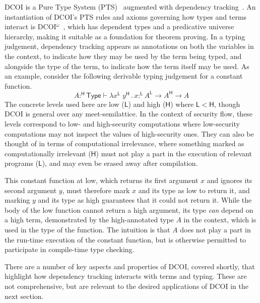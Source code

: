\documentclass{article}
\newcommand{\kw}[1]{\mathsf{#1}}
\newcommand{\HH}{\mathsf{H}}
\newcommand{\LL}{\mathsf{L}}
\begin{document}
DCOI is a Pure Type System (PTS)~\citep{pts} augmented with dependency tracking~\cite{dcc}.
An instantiation of DCOI's PTS rules and axioms governing how types and terms interact
is DCOI$^\omega$~\citep{dcoi-omega},
which has dependent types and a predicative universe hierarchy,
making it suitable as a foundation for theorem proving.
In a typing judgement, dependency tracking appears as annotations
on both the variables in the context,
to indicate how they may be used by the term being typed,
and alongside the type of the term,
to indicate how the term itself may be used.
As an example, consider the following derivable typing judgement for a constant function.
$$A :^\HH \kw{Type} \vdash \lambda x^\LL \; y^\HH \mathpunct{.} x :^\LL
  A^\LL \to A^\HH \to A$$
The concrete levels used here are low ($\LL$) and high ($\HH$) where $\LL < \HH$,
though DCOI is general over any meet-semilattice.
In the context of security flow, these levels correspond to low- and high-security computations
where low-security computations may not inspect the values of high-security ones.
They can also be thought of in terms of computational irrelevance,
where something marked as computationally irrelevant ($\HH$)
must not play a part in the execution of relevant programs ($\LL$),
and may even be erased away after compilation.

This constant function at low,
which returns its first argument $x$ and ignores its second argument $y$,
must therefore mark $x$ and its type as low to return it,
and marking $y$ and its type as high guarantees that it could not return it.
While the body of the low function cannot return a high argument,
its type \emph{can} depend on a high term,
demonstrated by the high-annotated type $A$ in the context,
which is used in the type of the function.
The intuition is that $A$ does not play a part in the run-time execution of the constant function,
but is otherwise permitted to participate in compile-time type checking.

There are a number of key aspects and properties of DCOI, covered shortly,
that highlight how dependency tracking interacts with terms and typing.
These are not comprehensive,
but are relevant to the desired applications of DCOI in the next section.
\end{document}
